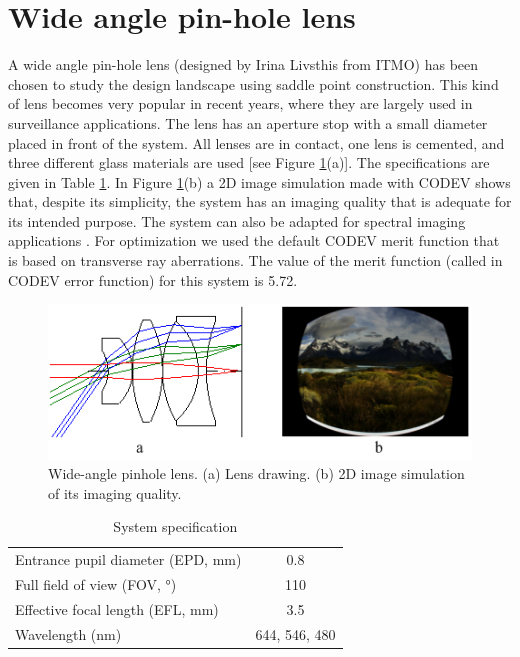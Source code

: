 \section{Wide angle pin-hole lens}

A wide angle pin-hole lens (designed by Irina Livsthis from ITMO) has been chosen to study the design landscape using saddle point construction. This kind of lens becomes very popular in recent years, where they are largely used in surveillance applications. The lens has an aperture stop with a small diameter placed in front of the system. All lenses are in contact, one lens is cemented, and three different glass materials are used [see Figure \ref{fig:widepinLens}(a)]. The specifications are given in Table \ref{table: sysspec}. In Figure \ref{fig:widepinLens}(b) a 2D image simulation made with CODEV shows that, despite its simplicity, the system has an imaging quality that is adequate for its intended purpose. The system can also be adapted for spectral imaging applications \cite{Strauch2015}. For optimization we used the default CODEV merit function that is based on transverse ray aberrations. The value of the merit function (called in CODEV error function) for this system is 5.72.

\begin{figure}[h!]
    \centering
    \includegraphics[scale=0.72]{chapter-3/figures/WidePinLens.png}
    \caption{Wide-angle pinhole lens. (a) Lens drawing. (b) 2D image simulation of its imaging quality.}
    \label{fig:widepinLens}
\end{figure}

\setlength{\arrayrulewidth}{.5mm}
\setlength{\tabcolsep}{18pt}
\renewcommand{\arraystretch}{1.2}
\begin{table}[h!]
    \centering
    \captionsetup{justification=centering}
    \caption{System specification}
    \label{table: sysspec}
    \vspace{-1em}
    \begin{tabular}{ p{20em} c }
    \hline 
    Entrance pupil diameter (EPD, mm) & 0.8\\
    Full field of view (FOV, °) & 110\\
    Effective focal length (EFL, mm) & 3.5\\
    Wavelength (nm) & 644, 546, 480\\
    \hline
    \end{tabular}
\end{table}





